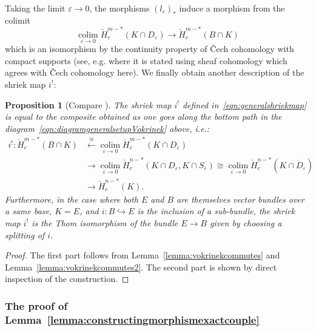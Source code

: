 \documentclass[a4paper]{amsart}
\newcommand{\lra}{\longrightarrow}
\DeclareMathOperator*{\colim}{colim}
\theoremstyle{plain}
\newtheorem{proposition}[theorem]{Proposition}
\theoremstyle{definition}
\newcommand{\CCH}{\check{H}_{c}}
\renewcommand{\epsilon}{\varepsilon}
\begin{document}
Taking the limit $\varepsilon \to 0$, the morphisms $(l_\varepsilon)_*$ induce a morphism from the colimit
\[
    \colim\limits_{\epsilon \to 0} \CCH^{m-*}(K \cap D_\varepsilon) \lra \CCH^{m-*}(B\cap K)
\]
which is an isomorphism by the continuity property of \v{C}ech cohomology with compact supports (see, e.g. \cite[Theorem 14.4]{bredon_sheaf_1997} where it is stated using sheaf cohomology which agrees with \v{C}ech cohomology here). We finally obtain another description of the shriek map $i^!$:
\begin{proposition}[Compare {\cite[Theorem D.3]{vokrinek_generalization_2007}}]\label{prop:vokrinekfinal}
The shriek map $i^!$ defined in~\eqref{eqn:generalshriekmap} is equal to the composite obtained as one goes along the bottom path in the diagram~\eqref{eqn:diagramgeneralsetupVokrinek} above, i.e.:
\begin{equation*}
\begin{split}
    i^! \colon \CCH^{m-*}(B\cap K) &\overset{\cong}{\longleftarrow} \colim\limits_{\epsilon \to 0} \CCH^{m-*}(K \cap D_\varepsilon) \\
    &\lra \colim\limits_{\epsilon \to 0} \CCH^{n-*}(K \cap D_\varepsilon, K \cap S_\varepsilon) \cong \colim\limits_{\epsilon \to 0} \CCH^{n-*}(K \cap \mathring{D}_\varepsilon) \\
    &\lra \CCH^{n-*}(K).
\end{split}
\end{equation*}
Furthermore, in the case where both $E$ and $B$ are themselves vector bundles over a same base, $K = E$, and $i \colon B \hookrightarrow E$ is the inclusion of a sub-bundle, the shriek map $i^!$ is the Thom isomorphism of the bundle $E \to B$ given by choosing a splitting of $i$.
\end{proposition}

\begin{proof}
The first part follows from Lemma~\ref{lemma:vokrinekcommutes} and Lemma~\ref{lemma:vokrinekcommutes2}. The second part is shown by direct inspection of the construction.
\end{proof}

\subsubsection{The proof of Lemma~\ref{lemma:constructingmorphismexactcouple}}
\end{document}
